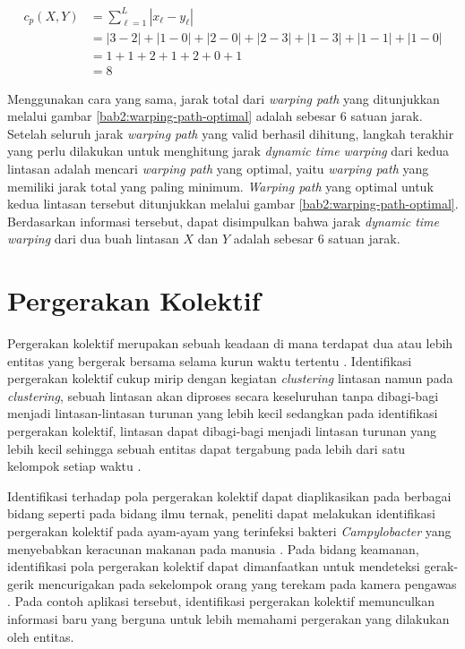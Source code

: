 \vspace{-7.5pt}

\begin{align*}
    c_p(X, Y) & = \sum_{\ell = 1}^{L} |x_\ell - y_\ell| \\
    & = |3 - 2| + |1 - 0| + |2 - 0| + |2 - 3| + |1 - 3| + |1 - 1| + |1 - 0| \\
    & = 1 + 1 + 2 + 1 + 2 + 0 + 1 \\
    & = 8
\end{align*}

Menggunakan cara yang sama, jarak total dari \textit{warping path} yang ditunjukkan melalui gambar \ref{bab2:warping-path-optimal} adalah sebesar $6$ satuan jarak. Setelah seluruh jarak \textit{warping path} yang valid berhasil dihitung, langkah terakhir yang perlu dilakukan untuk menghitung jarak \textit{dynamic time warping} dari kedua lintasan adalah mencari \textit{warping path} yang optimal, yaitu \textit{warping path} yang memiliki jarak total yang paling minimum. \textit{Warping path} yang optimal untuk kedua lintasan tersebut ditunjukkan melalui gambar \ref{bab2:warping-path-optimal}. Berdasarkan informasi tersebut, dapat disimpulkan bahwa jarak \textit{dynamic time warping} dari dua buah lintasan $X$ dan $Y$ adalah sebesar $6$ satuan jarak.

\iffalse 

\lionov{harus ditambah contoh perhitungan}

\fi

\section{Pergerakan Kolektif}
\label{sec:collective-movement}

Pergerakan kolektif merupakan sebuah keadaan di mana terdapat dua atau lebih entitas yang bergerak bersama selama kurun waktu tertentu \cite{wiratma:trajectory}. Identifikasi pergerakan kolektif cukup mirip dengan kegiatan \textit{clustering} lintasan namun pada \textit{clustering}, sebuah lintasan akan diproses secara keseluruhan tanpa dibagi-bagi menjadi lintasan-lintasan turunan yang lebih kecil sedangkan pada identifikasi pergerakan kolektif, lintasan dapat dibagi-bagi menjadi lintasan turunan yang lebih kecil sehingga sebuah entitas dapat tergabung pada lebih dari satu kelompok setiap waktu \cite{wiratma:trajectory}.

Identifikasi terhadap pola pergerakan kolektif dapat diaplikasikan pada berbagai bidang seperti pada bidang ilmu ternak, peneliti dapat melakukan identifikasi pergerakan kolektif pada ayam-ayam yang terinfeksi bakteri \textit{Campylobacter} yang menyebabkan keracunan makanan pada manusia \cite{colles:02:chicken}. Pada bidang keamanan, identifikasi pola pergerakan kolektif dapat dimanfaatkan untuk mendeteksi gerak-gerik mencurigakan pada sekelompok orang yang terekam pada kamera pengawas \cite{makris:01:security}. Pada contoh aplikasi tersebut, identifikasi pergerakan kolektif memunculkan informasi baru yang berguna untuk lebih memahami pergerakan yang dilakukan oleh entitas.

